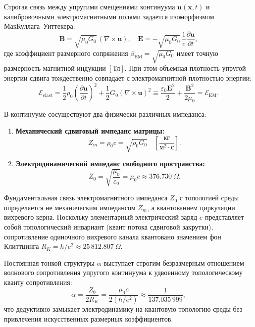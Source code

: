 \documentclass[11pt,a4paper]{article}
\theoremstyle{definition}
\theoremstyle{remark}
\begin{document}
Строгая связь между упругими смещениями континуума $\mathbf{u}(\mathbf{x}, t)$ 
и калибровочными электромагнитными полями задается изоморфизмом 
МакКуллага--Уиттекера:
\begin{equation}
	\mathbf{B} = \sqrt{\mu_0 G_0} \, (\nabla \times \mathbf{u}), \quad 
	\mathbf{E} = -\sqrt{\mu_0 G_0} \, \frac{1}{c} \frac{\partial \mathbf{u}}{\partial t},
	\label{eq:maccullagh_isomorphism}
\end{equation}
где коэффициент размерного сопряжения $\beta_{\text{EM}} = \sqrt{\mu_0 G_0}$ 
имеет точную размерность магнитной индукции $[\text{Тл}]$. При этом объемная плотность 
упругой энергии сдвига тождественно совпадает с электромагнитной плотностью энергии:
\begin{equation}
	\mathcal{E}_{\text{elast}} = \frac{1}{2}\rho_0 \left(\frac{\partial \mathbf{u}}{\partial t}\right)^2 + \frac{1}{2}G_0 (\nabla \times \mathbf{u})^2 
	\equiv \frac{\varepsilon_0 \mathbf{E}^2}{2} + \frac{\mathbf{B}^2}{2\mu_0} = \mathcal{E}_{\text{EM}}.
\end{equation}

В континууме сосуществуют два физически различных импеданса:
\begin{enumerate}
	\item \textbf{Механический сдвиговый импеданс матрицы:}
	\begin{equation}
		Z_m = \rho_0 c = \sqrt{\rho_0 G_0} \quad \left[\frac{\text{кг}}{\text{м}^2 \cdot \text{с}}\right].
	\end{equation}
	\item \textbf{Электродинамический импеданс свободного пространства:}
	\begin{equation}
		Z_0 = \sqrt{\frac{\mu_0}{\varepsilon_0}} = \mu_0 c \approx 376.730\ \Omega.
	\end{equation}
\end{enumerate}

Фундаментальная связь электромагнитного импеданса $Z_0$ с топологией среды 
определяется не механическим импедансом $Z_m$, а квантованием циркуляции 
вихревого керна. Поскольку элементарный электрический заряд $e$ представляет собой 
топологический инвариант (квант потока сдвиговой закрутки), сопротивление 
одиночного вихревого канала квантовано значением фон Клиттцинга $R_K = h/e^2 \approx 25\,812.807\ \Omega$.

Постоянная тонкой структуры $\alpha$ выступает строгим безразмерным отношением 
волнового сопротивления упругого континуума к удвоенному топологическому кванту сопротивления:
\begin{equation}
	\alpha = \frac{Z_0}{2 R_K} = \frac{\mu_0 c}{2 (h/e^2)} \approx \frac{1}{137.035\,999},
	\label{eq:alpha_impedance_ratio}
\end{equation}
что дедуктивно замыкает электродинамику на квантовую топологию среды без привлечения 
искусственных размерных коэффициентов.
\end{document}
